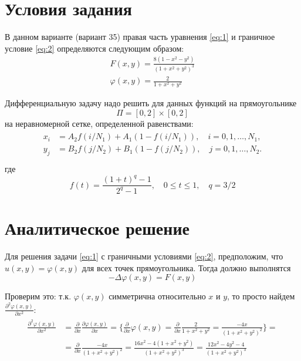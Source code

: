 \documentclass[12pt, a4paper]{article}
\begin{document}
    \section{Условия задания}\label{sec:cond}
        В данном варианте (вариант 35) правая часть уравнения \eqref{eq:1} и граничное условие \eqref{eq:2} определяются следующим образом:
            \begin{gather}
                F(x, y) = \frac{8(1 - x^2 - y^2)}{(1 + x^2 + y^2)^3} \label{eq:F}\\
                \varphi(x, y) = \frac{2}{1 + x^2 + y^2} \label{eq:phi}
            \end{gather}

        Дифференциальную задачу надо решить для данных функций на прямоугольнике $$\Pi = [0, 2] \times [0, 2]$$ на неравномерной сетке, определенной равенствами:
            \begin{gather}
            \begin{aligned}
                x_i &= A_2 f(i / N_1) + A_1 (1 - f(i / N_1)), \quad i = 0, 1, \dots, N_1,\\
                y_j &= B_2 f(j / N_2) + B_1 (1 - f(j / N_2)), \quad j = 0, 1, \dots, N_2.\\
            \end{aligned}
            \end{gather}
        где
            $$f(t) = \frac{(1 + t)^q - 1}{2^q - 1}, \quad 0 \leq t \leq 1, \quad q = 3/2$$

    \section{Аналитическое решение}
        Для решения задачи \eqref{eq:1} с граничными условиями \eqref{eq:2}, предположим, что $u(x, y) = \varphi(x, y)$ для всех точек прямоугольника. Тогда должно выполнятся
        $$-\Delta \varphi(x, y) = F(x, y)$$

        Проверим это: т.к. $\varphi(x, y)$ симметрична относительно $x$ и $y$, то просто найдем $\frac{\partial^2 \varphi(x, y)}{\partial x^2}$:
        \begin{gather*}
        \begin{aligned}
            \frac{\partial^2 \varphi(x, y)}{\partial x^2} &= \frac{\partial}{\partial x} \frac{\partial \varphi(x, y)}{\partial x} = \Big\{
                \frac{\partial}{\partial x} \varphi(x, y) = \frac{\partial}{\partial x} \frac{2}{1 + x^2 + y^2} = \frac{-4x}{(1 + x^2 + y^2)^2}
            \Big\} =\\
            &= \frac{\partial}{\partial x} \frac{-4x}{(1 + x^2 + y^2)^2} = \frac{16x^2 - 4(1 + x^2 + y^2)}{(1 + x^2 + y^2)^3} = \frac{12x^2 - 4y^2 - 4}{(1 + x^2 + y^2)^3}
        \end{aligned}
        \end{gather*}
\end{document}
